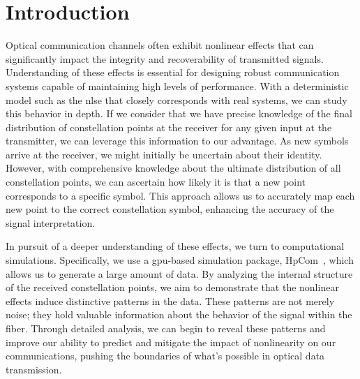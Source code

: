 

\section{Introduction}
Optical communication channels often exhibit nonlinear effects that can significantly impact the integrity and recoverability of transmitted signals. Understanding of these effects is essential for designing robust communication systems capable of maintaining high levels of performance. 
With a deterministic model such as the \Gls{nlse} that closely corresponds with real systems, we can study this behavior in depth. If we consider that we have precise knowledge of the final distribution of constellation points at the receiver for any given input at the transmitter, we can leverage this information to our advantage. As new symbols arrive at the receiver, we might initially be uncertain about their identity. However, with comprehensive knowledge about the ultimate distribution of all constellation points, we can ascertain how likely it is that a new point corresponds to a specific symbol. This approach allows us to accurately map each new point to the correct constellation symbol, enhancing the accuracy of the signal interpretation.

In pursuit of a deeper understanding of these effects, we turn to computational simulations. Specifically, we use a \acrshort{gpu}-based simulation package, HpCom~\cite{esf0_2023_7880552}, which allows us to generate a large amount of data. By analyzing the internal structure of the received constellation points, we aim to demonstrate that the nonlinear effects induce distinctive patterns in the data. These patterns are not merely noise; they hold valuable information about the behavior of the signal within the fiber. Through detailed analysis, we can begin to reveal these patterns and improve our ability to predict and mitigate the impact of nonlinearity on our communications, pushing the boundaries of what's possible in optical data transmission. 

